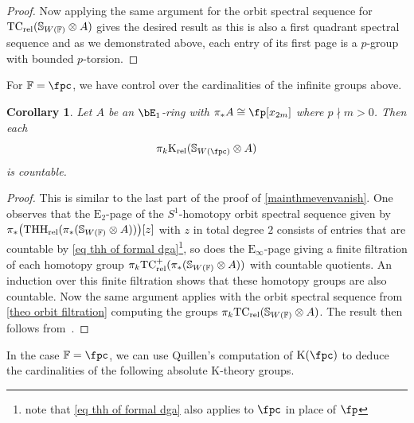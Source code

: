 \documentclass[english,10pt]{amsart}
\newcommand{\sph}{\mathbb{S}}
\newcommand{\sphwf}{\mathbb{S}_{W(\mathbb{F)}}}
\newcommand{\rel}{\textup{rel}}
\newcommand{\field}{\mathbb{F}}
\newtheorem{coro}{Corollary}[section]
\theoremstyle{definition}
\numberwithin{equation}{section}
\newcommand{\rtc}{\mathrm{TC}_{\rel}}
\newcommand{\rthh}{\mathrm{THH}_{\rel}}
\newcommand{\pis}{\pi_*}
\begin{document}
\begin{proof}
 Now applying the same argument for the orbit spectral sequence for $\rtc(\sphwf \otimes A)$ gives the desired result as this is also a first quadrant spectral sequence and as we demonstrated above, each entry of its first page is a $p$-group with bounded $p$-torsion.
\end{proof}

For $\field = \fpc$, we have control over the cardinalities of the infinite groups above. 

\begin{coro}\label{coro countable relative k theory groups}
Let $A$ be an $\bE_1$-ring with $\pis A \cong \fp[x_{2m}]$ where $p \nmid m >0$. Then  each \[\pi_{k}\mathrm{K}_{\rel}(\sph_{W(\fpc)} \otimes A)\] is countable.
\end{coro}
\begin{proof}
This is similar to the last part of the proof of \autoref{mainthmevenvanish}.  One observes that the $\mathrm{E}_2$-page of the $S^1$-homotopy orbit spectral sequence given by $\pis \big(\rthh(\pis (\sphwf \otimes A))\big)[z]$ with $z$ in total degree $2$  consists of entries that are countable by \eqref{eq thh of formal dga}\footnote{note that \eqref{eq thh of formal dga} also applies to $\fpc$ in place of $\fp$}, so does the $\mathrm{E}_\infty$-page giving a finite filtration of each homotopy group $\pi_k\rtc^{+}(\pis (\sphwf \otimes A))$ with countable quotients. An induction over this finite filtration shows that these homotopy groups are also countable. Now the same argument applies with the orbit spectral sequence from \autoref{theo orbit filtration} computing the groups $\pi_k \rtc(\sphwf \otimes A)$. The result then follows from~\cite[Theorem~7.0.0.2]{DGM13}. 
\end{proof}

In the case $\field = \fpc$, we can use Quillen's computation of $\mathrm{K}(\fpc)$ to deduce the cardinalities of the following absolute K-theory groups.
\end{document}
